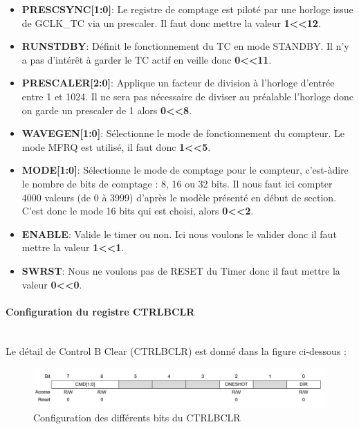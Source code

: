 \documentclass[a4paper]{article}
\begin{document}
	\begin{itemize}
		\item {\bf PRESCSYNC[1:0]}: Le registre de comptage est piloté par une horloge issue de GCLK\_TC via un prescaler. Il faut donc mettre la valeur {\bf 1\textless\textless12}.~~\\
		\item {\bf RUNSTDBY}: Définit le fonctionnement du TC en mode STANDBY. Il n’y a pas d’intérêt à garder le TC actif en veille donc {\bf 0\textless\textless11}.~~\\
		\item {\bf PRESCALER[2:0]}: Applique un facteur de division à l’horloge d’entrée entre 1 et 1024. Il ne sera pas nécessaire de diviser au préalable l’horloge donc on garde un prescaler de 1 alors {\bf 0\textless\textless8}.~~\\
		\item {\bf WAVEGEN[1:0]}: Sélectionne le mode de fonctionnement du compteur. Le mode MFRQ est utilisé, il faut donc {\bf 1\textless\textless5}.~~\\
		\item {\bf MODE[1:0]}: Sélectionne le mode de comptage pour le compteur, c’est-àdire le nombre de bits de comptage : 8, 16 ou 32 bits. Il nous faut ici compter 4000 valeurs (de 0 à 3999) d’après le modèle présenté en début de section. C’est donc le mode 16 bits qui est choisi, alors {\bf 0\textless\textless2}.~~\\
		\item {\bf ENABLE}: Valide le timer ou non. Ici nous voulons le valider donc il faut mettre la valeur {\bf 1\textless\textless1}.~~\\
		\item {\bf SWRST}: Nous ne voulons pas de RESET du Timer donc il faut mettre la valeur {\bf 0\textless\textless0}.~~\\
	\end{itemize}
	
	\newpage
	\paragraph{Configuration du registre CTRLBCLR} 
	~~\\
	Le détail de Control B Clear (CTRLBCLR) est donné dans la figure ci-dessous :
	\begin{figure}[H]
		\centering
		\includegraphics[width=0.9\linewidth]{CTRLBCLR.jpg}
		\caption{Configuration des différents bits du CTRLBCLR}
	\end{figure}
	
\end{document}
